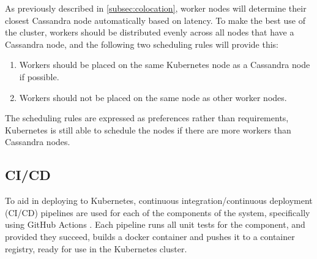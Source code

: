 As previously described in \ref{subsec:colocation}, worker nodes will determine their closest Cassandra node automatically based on latency. To make the best use of the cluster, workers should be distributed evenly across all nodes that have a Cassandra node, and the following two scheduling rules will provide this:
\begin{enumerate}
	\item Workers should be placed on the same Kubernetes node as a Cassandra node if possible.
	\item Workers should not be placed on the same node as other worker nodes.
\end{enumerate}

The scheduling rules are expressed as preferences rather than requirements, Kubernetes is still able to schedule the nodes if there are more workers than Cassandra nodes.

\subsection{CI/CD}
To aid in deploying to Kubernetes, continuous integration/continuous deployment (CI/CD) pipelines are used for each of the components of the system, specifically using GitHub Actions \cite{githubactions}. Each pipeline runs all unit tests for the component, and provided they succeed, builds a docker container and pushes it to a container registry, ready for use in the Kubernetes cluster.

